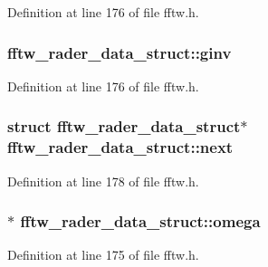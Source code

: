 Definition at line 176 of file fftw.\+h.

\subsubsection[{\texorpdfstring{ginv}{ginv}}]{ fftw\+\_\+rader\+\_\+data\+\_\+struct\+::ginv}\hypertarget{structfftw__rader__data__struct_a257e9bf9422665e3f326e6785d7e9842}{}\label{structfftw__rader__data__struct_a257e9bf9422665e3f326e6785d7e9842}


Definition at line 176 of file fftw.\+h.

\subsubsection[{\texorpdfstring{next}{next}}]{\setlength{\rightskip}{0pt plus 5cm}struct {\bf fftw\+\_\+rader\+\_\+data\+\_\+struct}$\ast$ fftw\+\_\+rader\+\_\+data\+\_\+struct\+::next}\hypertarget{structfftw__rader__data__struct_add6c58655fd3f3a60398822f85d7d5b3}{}\label{structfftw__rader__data__struct_add6c58655fd3f3a60398822f85d7d5b3}


Definition at line 178 of file fftw.\+h.

\subsubsection[{\texorpdfstring{omega}{omega}}]{$\ast$ fftw\+\_\+rader\+\_\+data\+\_\+struct\+::omega}\hypertarget{structfftw__rader__data__struct_ad1d3d661e6e97fae6126859ca63a48ea}{}\label{structfftw__rader__data__struct_ad1d3d661e6e97fae6126859ca63a48ea}


Definition at line 175 of file fftw.\+h.

